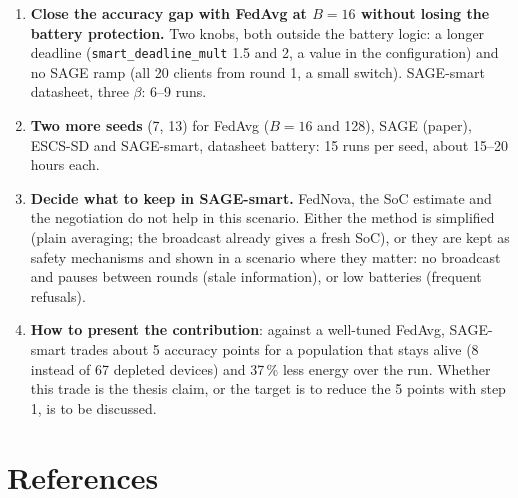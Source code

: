 \documentclass[11pt,a4paper]{article}
\begin{document}
\begin{enumerate}
  \item \textbf{Close the accuracy gap with FedAvg at $B=16$ without losing
        the battery protection.} Two knobs, both outside the battery logic:
        a longer deadline (\texttt{smart\_deadline\_mult} 1.5 and 2, a value
        in the configuration) and no SAGE ramp (all 20 clients from round 1,
        a small switch). SAGE-smart datasheet, three $\beta$: 6--9 runs.
  \item \textbf{Two more seeds} (7, 13) for FedAvg ($B=16$ and 128), SAGE
        (paper), ESCS-SD and SAGE-smart, datasheet battery: 15 runs per seed,
        about 15--20 hours each.
  \item \textbf{Decide what to keep in SAGE-smart.} FedNova, the SoC estimate
        and the negotiation do not help in this scenario. Either the method is
        simplified (plain averaging; the broadcast already gives a fresh SoC),
        or they are kept as safety mechanisms and shown in a scenario where
        they matter: no broadcast and pauses between rounds (stale
        information), or low batteries (frequent refusals).
  \item \textbf{How to present the contribution}: against a well-tuned FedAvg,
        SAGE-smart trades about 5 accuracy points for a population that stays
        alive (8 instead of 67 depleted devices) and 37\,\% less energy over
        the run. Whether this trade is the thesis claim, or the target is to
        reduce the 5 points with step 1, is to be discussed.
\end{enumerate}

\section*{References}
\end{document}
